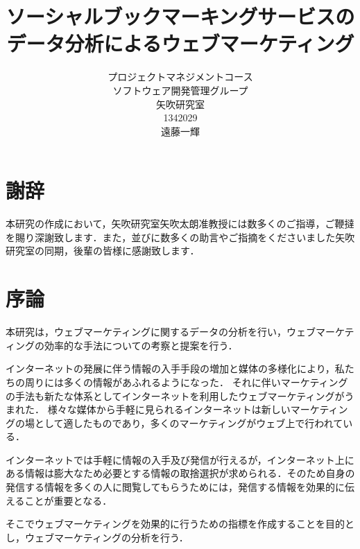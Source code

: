 \title{ソーシャルブックマーキングサービスのデータ分析によるウェブマーケティング}
\author{プロジェクトマネジメントコース\\
ソフトウェア開発管理グループ\\
矢吹研究室\\
1342029\\
遠藤一輝}
\date{}

\maketitle





\chapter*{謝辞}

本研究の作成において，矢吹研究室矢吹太朗准教授には数多くのご指導，ご鞭撻を賜り深謝致します．また，並びに数多くの助言やご指摘をくださいました矢吹研究室の同期，後輩の皆様に感謝致します．

\tableofcontents%

\chapter{序論}
本研究は，ウェブマーケティングに関するデータの分析を行い，ウェブマーケティングの効率的な手法についての考察と提案を行う．\par
インターネットの発展に伴う情報の入手手段の増加と媒体の多様化により，私たちの周りには多くの情報があふれるようになった．
それに伴いマーケティングの手法も新たな体系としてインターネットを利用したウェブマーケティングがうまれた．
様々な媒体から手軽に見られるインターネットは新しいマーケティングの場として適したものであり，多くのマーケティングがウェブ上で行われている．\par
インターネットでは手軽に情報の入手及び発信が行えるが，インターネット上にある情報は膨大なため必要とする情報の取捨選択が求められる．そのため自身の発信する情報を多くの人に閲覧してもらうためには，発信する情報を効果的に伝えることが重要となる．\par
そこでウェブマーケティングを効果的に行うための指標を作成することを目的とし，ウェブマーケティングの分析を行う．

